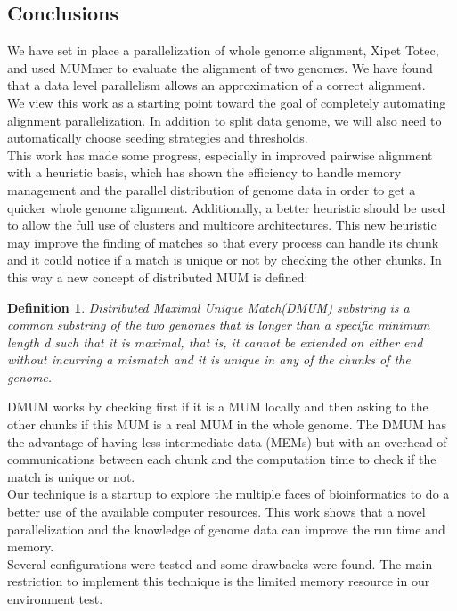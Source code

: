\documentclass[10pt]{bmc_article}
\newtheorem{mydef}{Definition}
\newenvironment{bmcformat}{\begin{raggedright}\baselineskip20pt\sloppy\setboolean{publ}{false}}{\end{raggedright}\baselineskip20pt\sloppy}
\begin{document}
\begin{bmcformat}
\section*{Conclusions}
We have set in place a parallelization of whole genome alignment, Xipet Totec, and used MUMmer to evaluate the alignment of two genomes. We have found that a data level parallelism allows an approximation of a correct alignment.\\
We view this work as a starting point toward the goal of completely automating alignment parallelization. In addition to split data genome, we will also need to automatically choose seeding strategies and thresholds. \\
This work has made some progress, especially in improved pairwise alignment with a heuristic basis, which has shown the efficiency to handle memory management and the parallel distribution of genome data in order to get a quicker whole genome alignment. Additionally, a better heuristic should be used to allow the full use of clusters and multicore architectures. This new heuristic may improve the finding of matches so that every process can handle its chunk and it could notice if a match is unique or not by checking the other chunks. In this way a new concept of distributed MUM is defined:
\begin{center}
\begin{mydef}
Distributed Maximal Unique Match(DMUM) substring is a common substring of the two genomes that is longer than a specific minimum length d such that it is maximal, that is, it cannot be extended on either end without incurring a mismatch and it is unique in any of the chunks of the genome.
\end{mydef}
\end{center}
DMUM works by checking first if it is a MUM locally and then asking to the other chunks if this MUM is a real MUM in the whole genome. The DMUM has the advantage of having less intermediate data (MEMs) but with an overhead of communications between each chunk and the computation time to check if the match is unique or not.\\
Our technique is a startup to explore the multiple faces of bioinformatics to do a better use of the available computer resources. This work shows that a novel parallelization and the knowledge of genome data can improve the run time and memory.\\
Several configurations were tested and some drawbacks were found. The main restriction to implement this technique  is the  limited memory resource in our environment test.
  

\end{bmcformat}
\end{document}
